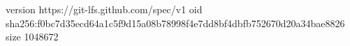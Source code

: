version https://git-lfs.github.com/spec/v1
oid sha256:f0bc7d35ecd64a1c5f9d15a08b78998f4e7dd8bf4dbfb752670d20a34bae8826
size 1048672
